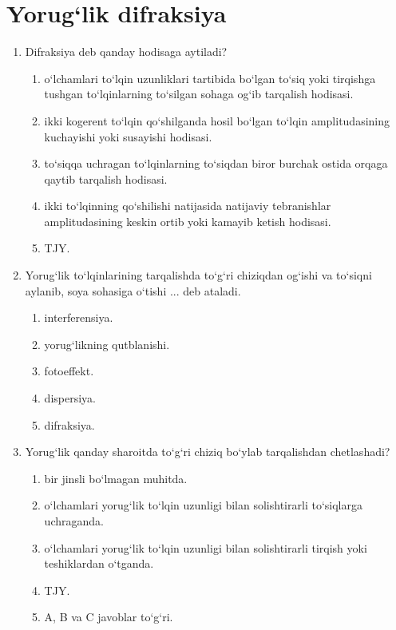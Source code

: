 \section{Yorug‘lik  difraksiya}


\begin{enumerate}

\item Difraksiya deb qanday hodisaga aytiladi?
\begin{enumerate}[label=\Alph*)]
\item o‘lchamlari to‘lqin uzunliklari tartibida bo‘lgan to‘siq yoki tirqishga tushgan to‘lqinlarning to‘silgan sohaga og‘ib tarqalish hodisasi.
\item ikki kogerent to‘lqin qo‘shilganda hosil bo‘lgan to‘lqin amplitudasining kuchayishi yoki susayishi hodisasi.
\item to‘siqqa uchragan to‘lqinlarning to‘siqdan biror burchak ostida orqaga qaytib tarqalish hodisasi.
\item ikki to‘lqinning qo‘shilishi natijasida natijaviy tebranishlar amplitudasining keskin ortib yoki kamayib ketish hodisasi.
\item TJY.
\end{enumerate}

\item Yorug‘lik to‘lqinlarining tarqalishda to‘g‘ri chiziqdan og‘ishi va to‘siqni aylanib, soya sohasiga o‘tishi ... deb ataladi.
\begin{enumerate}[label=\Alph*)]
\item interferensiya.
\item yorug‘likning qutblanishi.
\item fotoeffekt.
\item dispersiya.
\item difraksiya.
\end{enumerate}

\item Yorug‘lik qanday sharoitda to‘g‘ri chiziq bo‘ylab tarqalishdan chetlashadi?
\begin{enumerate}[label=\Alph*)]
\item bir jinsli bo‘lmagan muhitda.
\item o‘lchamlari yorug‘lik to‘lqin uzunligi bilan solishtirarli to‘siqlarga uchraganda.
\item o‘lchamlari yorug‘lik to‘lqin uzunligi bilan solishtirarli tirqish yoki teshiklardan o‘tganda.
\item TJY.
\item A, B va C javoblar to‘g‘ri.
\end{enumerate}


\end{enumerate}
